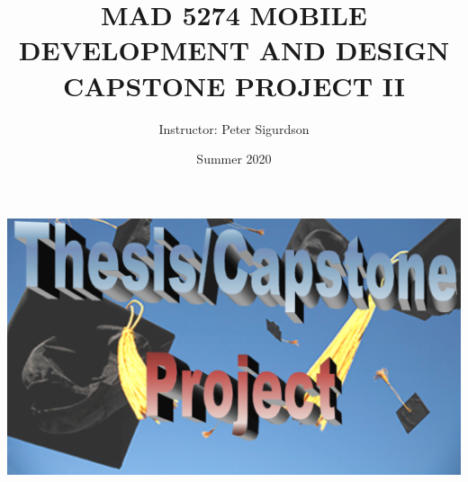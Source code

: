 \documentclass{article}
\title{MAD 5274 MOBILE DEVELOPMENT AND DESIGN CAPSTONE PROJECT II}
\author{Instructor: Peter Sigurdson }
\date{Summer 2020}
\begin{document}
\maketitle
\includegraphics [scale=.5] {images/ProjectSplashImage.png}





 
\end{document}
